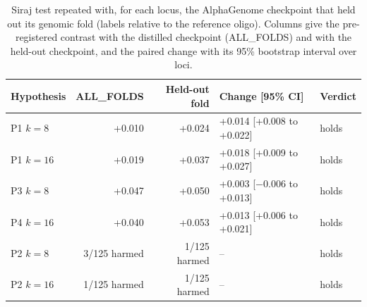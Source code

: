 \begin{table}[H]
\caption{Siraj test repeated with, for each locus, the AlphaGenome checkpoint that held out its genomic fold (labels relative to the reference oligo). Columns give the pre-registered contrast with the distilled checkpoint (ALL\_FOLDS) and with the held-out checkpoint, and the paired change with its 95\% bootstrap interval over loci.}\label{tab:s3}
\centering\small
\begin{tabular}{lrrll}
\toprule
Hypothesis & ALL\_FOLDS & Held-out fold & Change [95\% CI] & Verdict \\
\midrule
P1 $k=8$ & +0.010 & +0.024 & +0.014 [+0.008 to +0.022] & holds \\
P1 $k=16$ & +0.019 & +0.037 & +0.018 [+0.009 to +0.027] & holds \\
P3 $k=8$ & +0.047 & +0.050 & +0.003 [$-$0.006 to +0.013] & holds \\
P4 $k=16$ & +0.040 & +0.053 & +0.013 [+0.006 to +0.021] & holds \\
P2 $k=8$ & 3/125 harmed & 1/125 harmed & -- & holds \\
P2 $k=16$ & 1/125 harmed & 1/125 harmed & -- & holds \\
\bottomrule
\end{tabular}
\end{table}


